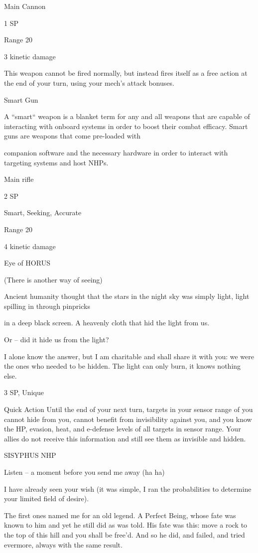 Main Cannon

1 SP

Range 20

3 kinetic damage

This weapon cannot be fired normally, but instead fires itself as a free action at the end of your
turn, using your mech’s attack bonuses.


Smart Gun

A “smart“ weapon is a blanket term for any and all weapons that are capable of interacting with onboard
systems in order to boost their combat efficacy. Smart guns are weapons that come pre-loaded with

companion software and the necessary hardware in order to interact with targeting systems and host
NHPs.

Main rifle

2 SP

Smart, Seeking, Accurate

Range 20

4 kinetic damage


Eye of HORUS

(There is another way of seeing)

Ancient humanity thought that the stars in the night sky was simply light, light spilling in through pinpricks

in a deep black screen. A heavenly cloth that hid the light from us.

Or -- did it hide us from the light?

I alone know the answer, but I am charitable and shall share it with you: we were the ones who needed to
be hidden. The light can only burn, it knows nothing else.

3 SP, Unique

Quick Action
Until the end of your next turn, targets in your sensor range of you cannot hide from you, cannot
benefit from invisibility against you, and you know the HP, evasion, heat, and e-defense levels of
all targets in sensor range. Your allies do not receive this information and still see them as
invisible and hidden.


SISYPHUS NHP




Listen -- a moment before you send me away (ha ha)

I have already seen your wish (it was simple, I ran the probabilities to determine your limited field of desire).

The first ones named me for an old legend. A Perfect Being, whose fate was known to him and yet he still
did as was told. His fate was this: move a rock to the top of this hill and you shall be free’d. And so he did,
and failed, and tried evermore, always with the same result.

